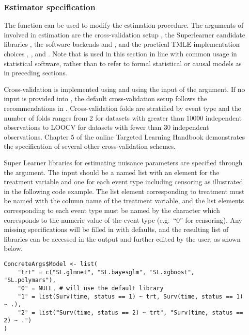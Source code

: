 \hypertarget{sec-estimation-spec}{%
\subsubsection{Estimator specification}\label{sec-estimation-spec}}

The  function can be used to modify the estimation procedure. The arguments of  involved in estimation are the cross-validation setup , the Superlearner candidate libraries , the software backends  and , and the practical TMLE implementation choices , , and . Note that  is used in this section in line with common usage in statistical software, rather than to refer to formal statistical or causal models as in preceding sections.

Cross-validation is implemented using  and using the input of the  argument. If no input is provided into , the default cross-validation setup follows the recommendations in \citep{phillips_practical_2022}. Cross-validation folds are stratified by event type and the number of folds ranges from 2 for datasets with greater than 10000 independent observations to LOOCV for datasets with fewer than 30 independent observations. Chapter 5 of the online Targeted Learning Handbook \citep{malenica_chapter_nodate} demonstrates the specification of several other cross-validation schemes.

Super Learner libraries for estimating nuisance parameters are specified through the  argument. The input should be a named list with an element for the treatment variable and one for each event type including censoring as illustrated in the following code example. The list element corresponding to treatment must be named with the column name of the treatment variable, and the list elements corresponding to each event type must be named by the character which corresponds to the numeric value of the event type (e.g.~``0'' for censoring). Any missing specifications will be filled in with defaults, and the resulting list of libraries can be accessed in the output  and further edited by the user, as shown below.

\begin{verbatim}
ConcreteArgs$Model <- list(
    "trt" = c("SL.glmnet", "SL.bayesglm", "SL.xgboost", "SL.polymars"),
    "0" = NULL, # will use the default library
    "1" = list(Surv(time, status == 1) ~ trt, Surv(time, status == 1) ~ .),
    "2" = list("Surv(time, status == 2) ~ trt", "Surv(time, status == 2) ~ .")
)
\end{verbatim}

